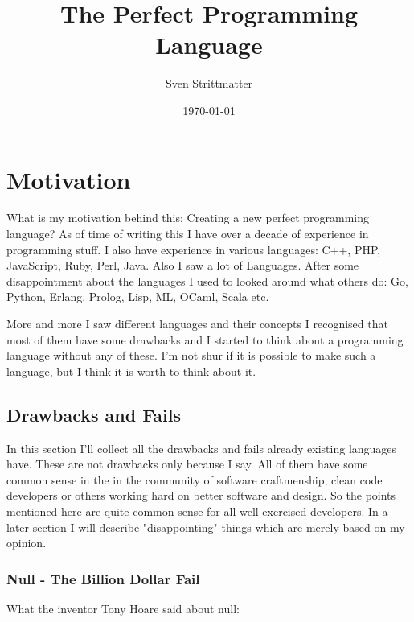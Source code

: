 \documentclass[a4paper,12pt]{article}
\title{The Perfect Programming Language}
\author{Sven Strittmatter}
\date{\today}
\begin{document}
\maketitle
{}
\newpage

\tableofcontents
\newpage

\section{Motivation}

What is my motivation behind this: Creating a new perfect programming language? As of time of writing this I have over a decade of experience in programming stuff. I also have experience in various languages: C++, PHP, JavaScript, Ruby, Perl, Java. Also I saw a lot of Languages. After some disappointment about the languages I used to looked around what others do: Go, Python, Erlang, Prolog, Lisp, ML, OCaml, Scala etc.

More and more I saw different languages and their concepts I recognised that most of them have some drawbacks and I started to think about a programming language without any of these. I'm not shur if it is possible to make such a language, but I think it is worth to think about it.

\subsection{Drawbacks and Fails}

In this section I'll collect all the drawbacks and fails already existing languages have. These are not drawbacks only because I say. All of them have some common sense in the in the community of software craftmenship, clean code developers or others working hard on better software and design. So the points mentioned here are quite common sense for all well exercised developers. In a later section I will describe "disappointing" things which are merely based on my opinion.

\subsubsection{Null - The Billion Dollar Fail}

What the inventor Tony Hoare\cite{hoare-wiki} said about null\cite{hoeare-null}:
\end{document}
